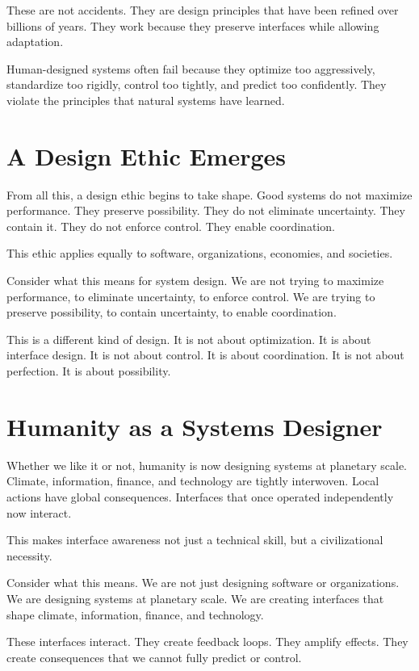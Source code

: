 \documentclass[
  openright]{book}
\begin{document}
These are not accidents. They are design principles that have been
refined over billions of years. They work because they preserve
interfaces while allowing adaptation.

Human-designed systems often fail because they optimize too
aggressively, standardize too rigidly, control too tightly, and predict
too confidently. They violate the principles that natural systems have
learned.

\section{A Design Ethic Emerges}\label{a-design-ethic-emerges}

From all this, a design ethic begins to take shape. Good systems do not
maximize performance. They preserve possibility. They do not eliminate
uncertainty. They contain it. They do not enforce control. They enable
coordination.

This ethic applies equally to software, organizations, economies, and
societies.

Consider what this means for system design. We are not trying to
maximize performance, to eliminate uncertainty, to enforce control. We
are trying to preserve possibility, to contain uncertainty, to enable
coordination.

This is a different kind of design. It is not about optimization. It is
about interface design. It is not about control. It is about
coordination. It is not about perfection. It is about possibility.

\section{Humanity as a Systems
Designer}\label{humanity-as-a-systems-designer}

Whether we like it or not, humanity is now designing systems at
planetary scale. Climate, information, finance, and technology are
tightly interwoven. Local actions have global consequences. Interfaces
that once operated independently now interact.

This makes interface awareness not just a technical skill, but a
civilizational necessity.

Consider what this means. We are not just designing software or
organizations. We are designing systems at planetary scale. We are
creating interfaces that shape climate, information, finance, and
technology.

These interfaces interact. They create feedback loops. They amplify
effects. They create consequences that we cannot fully predict or
control.
\end{document}
